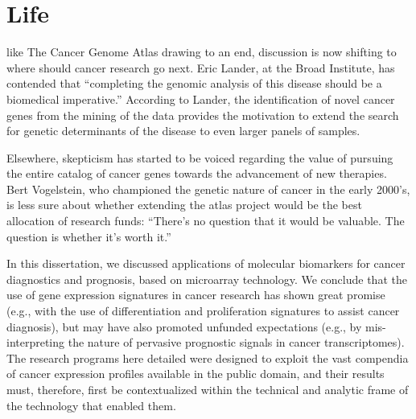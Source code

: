 \section{Life}
\label{life-discussion}

 like The Cancer Genome Atlas drawing to an end,
discussion is now shifting to where should cancer research go next.  Eric
Lander, at the Broad Institute, has contended that ``completing the genomic
analysis of this disease should be a biomedical
imperative.''\cite{lawrence_discovery_2014} According to Lander, the
identification of novel cancer genes from the mining of the 
data provides the motivation to extend the search for genetic determinants of
the disease to even larger panels of samples.

Elsewhere, skepticism has started to be voiced regarding the value of pursuing
the entire catalog of cancer genes towards the advancement of new therapies.
Bert Vogelstein, who championed the genetic nature of cancer in the early
2000's, is less sure about whether extending the atlas project would be the best
allocation of research funds: ``There’s no question that it would be
valuable. The question is whether it’s worth it.''\cite{zimmer_catalog_2014}

\medskip

In this dissertation, we discussed applications of molecular biomarkers for
cancer diagnostics and prognosis, based on microarray technology.  We conclude
that the use of gene expression signatures in cancer research has shown great
promise (e.g., with the use of differentiation and proliferation signatures to
assist cancer diagnosis), but may have also promoted unfunded expectations
(e.g., by mis-interpreting the nature of pervasive prognostic signals in cancer
transcriptomes).  The research programs here detailed were designed to exploit
the vast compendia of cancer expression profiles available in the public
domain, and their results must, therefore, first be contextualized within the
technical and analytic frame of the technology that enabled them.

